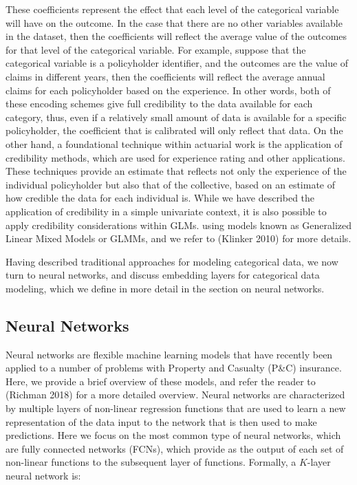 \documentclass{article}
\begin{document}
These coefficients represent the effect that each level of the
categorical variable will have on the outcome. In the case that there
are no other variables available in the dataset, then the coefficients
will reflect the average value of the outcomes for that level of the
categorical variable. For example, suppose that the categorical variable
is a policyholder identifier, and the outcomes are the value of claims
in different years, then the coefficients will reflect the average
annual claims for each policyholder based on the experience. In other
words, both of these encoding schemes give full credibility to the data
available for each category, thus, even if a relatively small amount of
data is available for a specific policyholder, the coefficient that is
calibrated will only reflect that data. On the other hand, a
foundational technique within actuarial work is the application of
credibility methods, which are used for experience rating and other
applications. These techniques provide an estimate that reflects not
only the experience of the individual policyholder but also that of the
collective, based on an estimate of how credible the data for each
individual is. While we have described the application of credibility in
a simple univariate context, it is also possible to apply credibility
considerations within GLMs. using models known as Generalized Linear
Mixed Models or GLMMs, and we refer to (Klinker 2010) for more details.

Having described traditional approaches for modeling categorical data,
we now turn to neural networks, and discuss embedding layers for
categorical data modeling, which we define in more detail in the section
on neural networks.

\hypertarget{neural-networks}{%
\subsection{Neural Networks}\label{neural-networks}}

Neural networks are flexible machine learning models that have recently
been applied to a number of problems with Property and Casualty (P\&C)
insurance. Here, we provide a brief overview of these models, and refer
the reader to (Richman 2018) for a more detailed overview. Neural
networks are characterized by multiple layers of non-linear regression
functions that are used to learn a new representation of the data input
to the network that is then used to make predictions. Here we focus on
the most common type of neural networks, which are fully connected
networks (FCNs), which provide as the output of each set of non-linear
functions to the subsequent layer of functions. Formally, a \(K\)-layer
neural network is:
\end{document}
